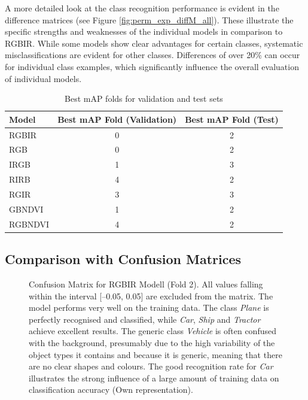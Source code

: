 A more detailed look at the class recognition performance is evident in the difference matrices (see Figure \ref{fig:perm_exp_diffM_all}). These illustrate the specific strengths and weaknesses of the individual models in comparison to RGBIR. While some models show clear advantages for certain classes, systematic misclassifications are evident for other classes. Differences of over 20\% can occur for individual class examples, which significantly influence the overall evaluation of individual models.
  






\begin{table}[h!]
\centering

\begin{tabular}{lcc}
\hline
\textbf{Model} & \textbf{Best mAP Fold (Validation)} & \textbf{Best mAP Fold (Test)} \\ \hline
RGBIR    & 0 & 2 \\
RGB      & 0 & 2 \\
IRGB     & 1 & 3 \\
RIRB     & 4 & 2 \\
RGIR     & 3 & 3 \\
GBNDVI   & 1 & 2 \\
RGBNDVI  & 4 & 2 \\ \hline
\end{tabular}
\caption{Best mAP folds for validation and test sets}
\label{tab:best_map_fold_perm_exp}
\end{table}




\FloatBarrier
\subsection*{Comparison with Confusion Matrices}
\label{subsec:permexp_comp_confusion_matric}


\begin{figure}[htbp]
    \centering
    
    \caption[Confusion Matrix for RGBIR Modell (Fold 2)]{Confusion Matrix for RGBIR Modell (Fold 2). All values falling within the interval [–0.05, 0.05] are excluded from the matrix. The model performs very well on the training data. The class \textit{Plane} is perfectly recognised and classified, while \textit{Car}, \textit{Ship} and \textit{Tractor} achieve excellent results. The generic class \textit{Vehicle} is often confused with the background, presumably due to the high variability of the object types it contains and because it is generic, meaning that there are no clear shapes and colours. The good recognition rate for \textit{Car} illustrates the strong influence of a large amount of training data on classification accuracy (Own representation).}
    \label{fig:perm_exp_confM_rgbir_f2}
\end{figure}

